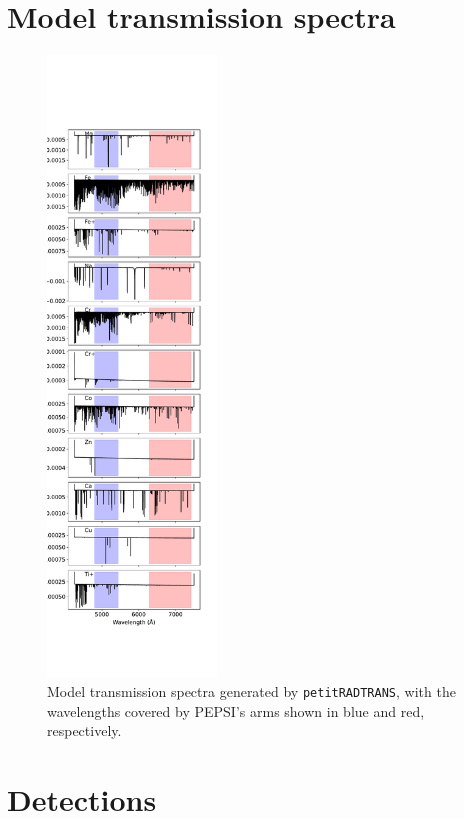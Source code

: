 \documentclass[twocolumn]{aastex631}
\newcommand{\code}[1]{\texttt{#1}}
\begin{document}
    \section{Model transmission spectra}
    \begin{figure}
        \label{fig:model-spectra-appendix}
        \includegraphics[width=0.4\textwidth]{plots-updated/spectra/spectra.KELT-20b.inverted-transmission-better.pdf}
    \caption{Model transmission spectra generated by \code{petitRADTRANS}, with the wavelengths covered by PEPSI's arms shown in blue and red, respectively.}
            
        \end{figure}    


   \section{Detections}
\end{document}
